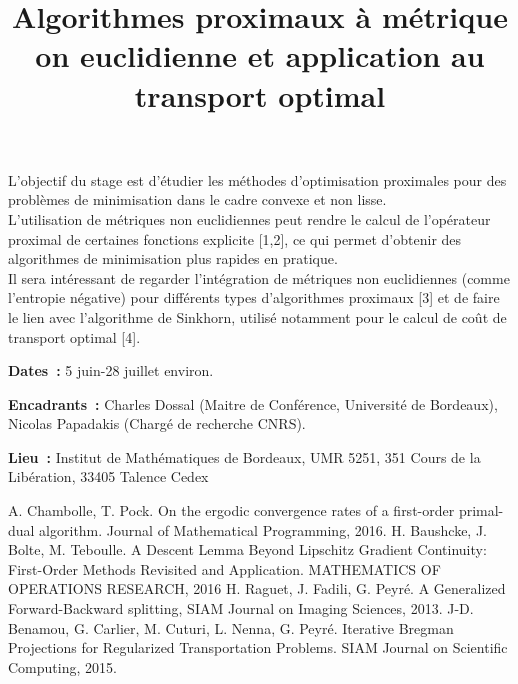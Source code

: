 \documentclass{article}
\title{Algorithmes proximaux à métrique on euclidienne et application au transport optimal}
\date{}
\begin{document}
\maketitle

L'objectif du stage est d'étudier les méthodes d'optimisation proximales pour des problèmes de minimisation dans le cadre convexe et non lisse.\\
L'utilisation de métriques non euclidiennes peut rendre le calcul de l'opérateur proximal de certaines fonctions explicite [1,2], ce qui permet d'obtenir des algorithmes de minimisation plus rapides en pratique.\\
Il sera intéressant de regarder l'intégration de métriques non euclidiennes (comme l'entropie négative) pour différents types d'algorithmes proximaux [3] et de faire le lien avec l'algorithme de Sinkhorn,
utilisé notamment pour le calcul de coût de transport optimal [4].

\textbf{Dates~:} 5 juin-28 juillet environ.

\textbf{Encadrants~:} Charles Dossal (Maitre de Conférence, Université de Bordeaux), Nicolas Papadakis (Chargé de recherche CNRS).

\textbf{Lieu~:} Institut de Mathématiques de Bordeaux, UMR 5251, 351 Cours de la Libération, 33405 Talence Cedex

\begin{thebibliography}{9}
A. Chambolle, T. Pock.  On the ergodic convergence rates of a first-order primal-dual algorithm.  Journal of Mathematical Programming, 2016.
H. Baushcke, J. Bolte, M. Teboulle. A Descent Lemma Beyond Lipschitz Gradient Continuity: First-Order Methods Revisited and Application. MATHEMATICS OF OPERATIONS RESEARCH, 2016
H. Raguet, J. Fadili, G. Peyré. A Generalized Forward-Backward splitting, SIAM Journal on Imaging Sciences, 2013.
J-D. Benamou, G. Carlier, M. Cuturi, L. Nenna, G. Peyré. Iterative Bregman Projections for Regularized Transportation Problems. SIAM Journal on Scientific Computing, 2015.
\end{thebibliography}
\end{document}
